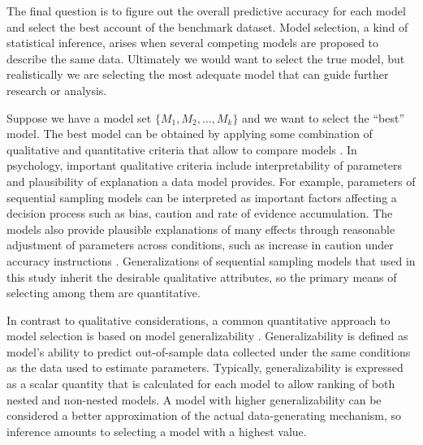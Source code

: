 \documentclass[12pt]{report}
\begin{document}
The final question is to figure out the overall predictive accuracy for each model and select the best account of the benchmark dataset. Model selection, a kind of statistical inference, arises when several competing models are proposed to describe the same data. Ultimately we would want to select the true model, but realistically we are selecting the most adequate model that can guide further research or analysis. 

Suppose we have a model set $\{M_1, M_2, \ldots, M_k\}$ and we want to select the ``best'' model. The best model can be obtained by applying some combination of qualitative and quantitative criteria that allow to compare models \citep{MyuKar2008,ShiLee2008,VanMat2014}.  In psychology, important qualitative criteria include interpretability of parameters and plausibility of explanation a data model provides. For example, parameters of sequential sampling models can be interpreted as important factors affecting a decision process such as bias, caution and rate of evidence accumulation. The models also provide plausible explanations of many effects through reasonable adjustment of parameters across conditions, such as increase in caution under accuracy instructions \citep{RatSmi2004}. Generalizations of sequential sampling models that used in this study inherit the desirable qualitative attributes, so the primary means of selecting among them are quantitative.
    
In contrast to qualitative considerations, a common quantitative
approach to model selection is based on model generalizability
\citep{GelHwa2013}. Generalizability is defined as model's
ability to predict out-of-sample data collected under the same
conditions as the data used to estimate parameters. Typically, generalizability is expressed as a scalar quantity that is calculated for each model to allow ranking of both nested and non-nested models. A model with higher generalizability can be
considered a better approximation of the actual
data-generating mechanism, so inference amounts to selecting a model with a highest value. 
\end{document}
